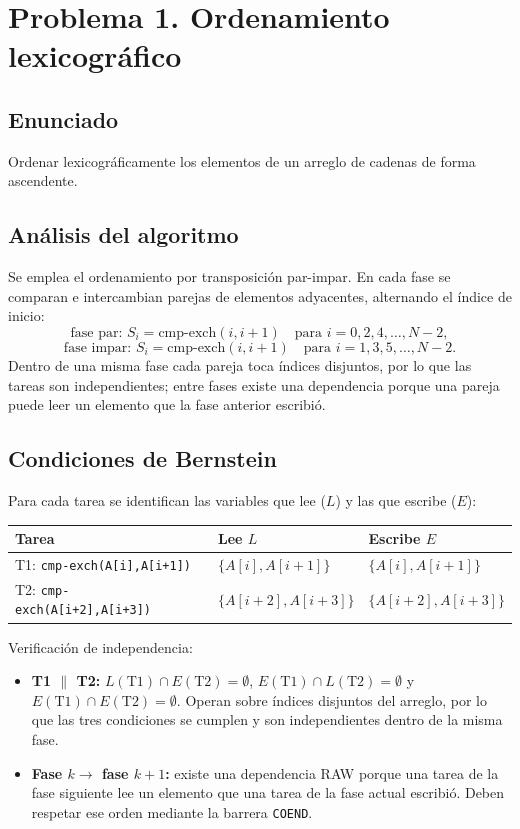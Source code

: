\section{Problema 1. Ordenamiento lexicogr\'afico}

\subsection*{Enunciado}
Ordenar lexicogr\'aficamente los elementos de un arreglo de cadenas de forma
ascendente.

\subsection*{An\'alisis del algoritmo}
Se emplea el ordenamiento por transposici\'on par-impar. En cada fase se
comparan e intercambian parejas de elementos adyacentes, alternando el \'indice
de inicio:
\[
    \text{fase par: } S_i = \text{cmp-exch}(i, i+1) \quad \text{para } i = 0, 2, 4, \dots, N-2,
\]
\[
    \text{fase impar: } S_i = \text{cmp-exch}(i, i+1) \quad \text{para } i = 1, 3, 5, \dots, N-2.
\]
Dentro de una misma fase cada pareja toca \'indices disjuntos, por lo que las
tareas son independientes; entre fases existe una dependencia porque una pareja
puede leer un elemento que la fase anterior escribi\'o.

\subsection*{Condiciones de Bernstein}
Para cada tarea se identifican las variables que lee ($L$) y las que escribe
($E$):

\begin{center}
\begin{tabular}{lll}
\toprule
Tarea & Lee $L$ & Escribe $E$ \\
\midrule
T1: \texttt{cmp-exch(A[i],A[i+1])}     & $\{A[i],A[i+1]\}$         & $\{A[i],A[i+1]\}$ \\
T2: \texttt{cmp-exch(A[i+2],A[i+3])}   & $\{A[i+2],A[i+3]\}$       & $\{A[i+2],A[i+3]\}$ \\
\bottomrule
\end{tabular}
\end{center}

Verificaci\'on de independencia:
\begin{itemize}[leftmargin=1.4cm]
    \item \textbf{T1 $\parallel$ T2:} $L(\text{T1}) \cap E(\text{T2}) =
    \emptyset$, $E(\text{T1}) \cap L(\text{T2}) = \emptyset$ y
    $E(\text{T1}) \cap E(\text{T2}) = \emptyset$. Operan sobre \'indices
    disjuntos del arreglo, por lo que las tres condiciones se cumplen y son
    independientes dentro de la misma fase.
    \item \textbf{Fase $k \rightarrow$ fase $k+1$:} existe una dependencia RAW
    porque una tarea de la fase siguiente lee un elemento que una tarea de la
    fase actual escribi\'o. Deben respetar ese orden mediante la barrera
    \texttt{COEND}.
\end{itemize}

